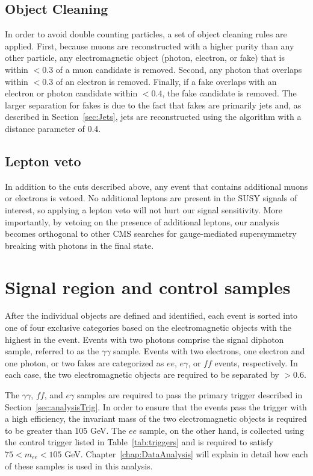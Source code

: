 \subsection{Object Cleaning}
\label{sec:ObjCleaning}

In order to avoid double counting particles, a set of object cleaning rules are applied. 
First, because muons are reconstructed with a higher purity than any other particle, 
any electromagnetic object (photon, electron, or fake) that is within \dR $< 0.3$ of a muon candidate is removed.
Second, any photon that overlaps within \dR $< 0.3$ of an electron is removed. Finally, if a fake overlaps with an electron or 
photon candidate within \dR $< 0.4$, the fake candidate is removed. The larger \dR separation for fakes is due to the fact
that fakes are primarily jets and, as described in Section~\ref{sec:Jets}, jets are reconstructed using the \antikt algorithm with a distance
parameter of 0.4.  

\subsection{Lepton veto}
\label{sec:lepVeto}

In addition to the cuts described above, any event that contains additional muons or electrons is vetoed. 
No additional leptons are present in the SUSY signals of interest, so applying a lepton veto will not hurt our signal sensitivity.
More importantly, by vetoing on the presence of additional leptons, our analysis becomes orthogonal to other CMS searches for
gauge-mediated supersymmetry breaking with photons in the final state. 

\section{Signal region and control samples}
\label{sec:samples}
After the individual objects are defined and identified, each event is sorted into one of four exclusive categories based on the electromagnetic objects with the highest \pT in the event. Events with two photons comprise the signal diphoton sample, referred to as the $\gamma\gamma$ sample. Events with two electrons, one electron and one photon, or two fakes are categorized as $ee$, $e\gamma$, or $ff$ events, respectively. In each case, the two electromagnetic objects are required to be separated by \dR $ > 0.6$. 

The  $\gamma\gamma$, $ff$, and $e\gamma$ samples are required to pass the primary trigger described in Section~\ref{sec:analysisTrig}. 
In order to ensure that the events pass the trigger with a high efficiency, the invariant mass of the two electromagnetic objects is required to be greater than 105 GeV. 
The $ee$ sample, on the other hand, is collected using the control trigger listed in Table~\ref{tab:triggers} and is required to satisfy $75 < m_{ee} < 105$ GeV. Chapter~\ref{chap:DataAnalysis} will explain in detail how each of these samples is used in this analysis.

